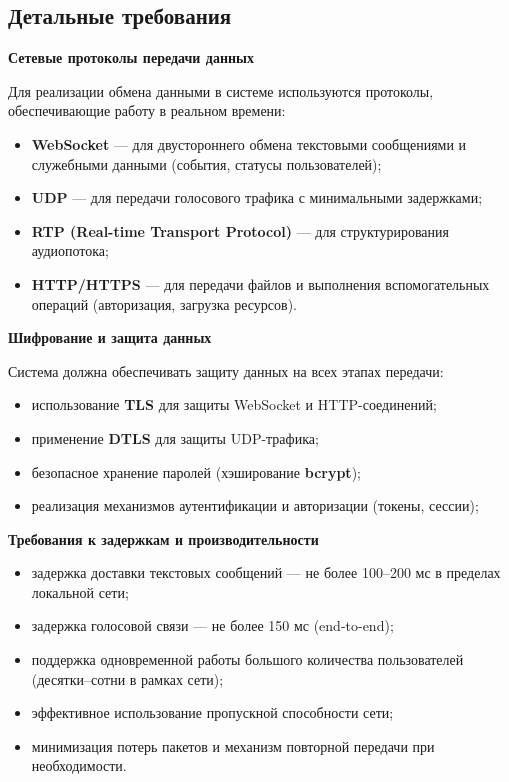 \documentclass[14pt,a4paper]{extarticle}
\begin{document}
\subsection{Детальные требования}

\textbf{Сетевые протоколы передачи данных}

Для реализации обмена данными в системе используются протоколы, обеспечивающие работу в реальном времени:
\begin{itemize}
\item \textbf{WebSocket} — для двустороннего обмена текстовыми сообщениями и служебными данными (события, статусы пользователей);
\item \textbf{UDP} — для передачи голосового трафика с минимальными задержками;
\item \textbf{RTP (Real-time Transport Protocol)} — для структурирования аудиопотока;
\item \textbf{HTTP/HTTPS} — для передачи файлов и выполнения вспомогательных операций (авторизация, загрузка ресурсов).
\end{itemize}

\textbf{Шифрование и защита данных}

Система должна обеспечивать защиту данных на всех этапах передачи:
\begin{itemize}
\item использование \textbf{TLS} для защиты WebSocket и HTTP-соединений;
\item применение \textbf{DTLS} для защиты UDP-трафика;
\item безопасное хранение паролей (хэширование \textbf{bcrypt});
\item реализация механизмов аутентификации и авторизации (токены, сессии);
\end{itemize}

\textbf{Требования к задержкам и производительности}

\begin{itemize}
\item задержка доставки текстовых сообщений — не более 100–200 мс в пределах локальной сети;
\item задержка голосовой связи — не более 150 мс (end-to-end);
\item поддержка одновременной работы большого количества пользователей (десятки–сотни в рамках сети);
\item эффективное использование пропускной способности сети;
\item минимизация потерь пакетов и механизм повторной передачи при необходимости.
\end{itemize}
\end{document}
